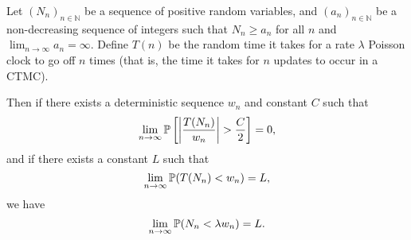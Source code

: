 	\begin{claim}
	\label{claim:discrete vs continuous distributions}
		Let $(N_n)_{n \in \mathbb{N}}$ be a sequence of positive random variables, and $(a_n)_{n \in \mathbb{N}}$ be a non-decreasing sequence of integers such that $N_n \geq a_n$ for all $n$ and $\lim_{n \rightarrow \infty} a_n = \infty$.	Define $T(n)$ be the random time it takes for a rate $\lambda$ Poisson clock to go off $n$ times (that is, the time it takes for $n$ updates to occur in a CTMC).

		Then if there exists a deterministic sequence $w_n$ and constant $C$ such that
		\begin{equation}
			\lim_{n\rightarrow \infty} \mathbb{P}\left[\left|\frac{T(N_n)}{w_n}\right| > \frac{C}{2}\right]  = 0,
			\label{eq:Z_n goes to zero}
		\end{equation}
		and if there exists a constant $L$ such that
		\begin{equation}
			\lim_{n \rightarrow \infty} \mathbb{P}(T(N_n) < w_n) = L,
			\label{eq:limit CT is L}
		\end{equation}	
		we have
		\begin{equation}
			\lim_{n \rightarrow \infty} \mathbb{P}(N_n < \lambda w_n) = L.
		\end{equation}
		
	\end{claim}
